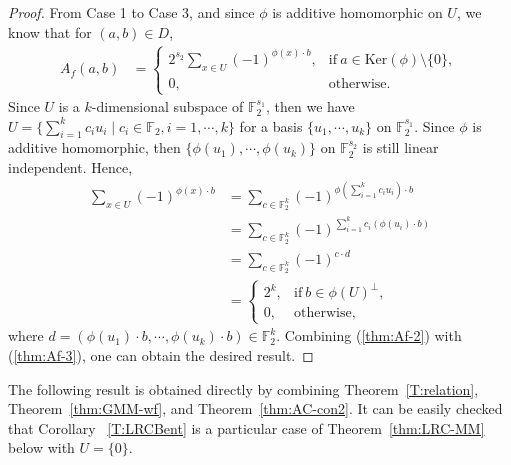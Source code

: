 \documentclass[10pt]{article}
\newcommand{\F}{\mathbb{F}}
\newcommand{\0}{\textbf{0}}
\newcommand{\1}{\textbf{1}}
\begin{document}
{\begin{proof}
    From Case 1 to Case 3, and since $\phi$ is additive homomorphic on $U$, we know that for  $(a,b)\in D$,
    \begin{align}\label{thm:Af-2}
        A_f(a,b)&=\left\{\begin{array}{ll}
                         2^{s_2} \sum_{x\in U} (-1)^{\phi(x)\cdot b}, & \mbox{if}~a\in \mathrm{Ker}(\phi)\setminus\{0\},\\
                         0, & \mbox{otherwise}.
                         \end{array}\right.
    \end{align}
    Since $U$ is a  $k$-dimensional subspace of $\F_2^{s_1}$, then we have $U=\{\sum_{i=1}^k c_i u_i\mid c_i\in \F_2, i=1,\cdots, k\}$ for a basis $\{u_1,\cdots, u_k\}$ on $\F_2^{s_1}$. Since $\phi$ is additive homomorphic, then $\{\phi(u_1),\cdots, \phi(u_k)\}$ on $\F_2^{s_2}$ is still linear independent.
    Hence,
    \begin{align}
    \nonumber    \sum_{x\in U} (-1)^{\phi(x)\cdot b}&=\sum_{c\in \F_2^k} (-1)^{\phi\left(\sum_{i=1}^k c_i u_i\right)\cdot b}\\
    \nonumber                                       &=\sum_{c\in \F_2^k} (-1)^{\sum_{i=1}^k c_i \left(\phi(u_i)\cdot b\right)}\\
    \nonumber                                       &=\sum_{c\in \F_2^k}(-1)^{c\cdot d}\\
    \label{thm:Af-3}                                       &=\left\{\begin{array}{ll}
                                                                     2^k, & \mbox{if}~b\in \phi(U)^\bot,\\
                                                                     0, & \mbox{otherwise},
                                                                    \end{array}\right.
    \end{align}
    where $d=(\phi(u_1)\cdot b,\cdots,\phi(u_k)\cdot b)\in \F_2^k$.
    Combining (\ref{thm:Af-2}) with (\ref{thm:Af-3}), one can obtain the desired result.
\end{proof}
}


The following result is obtained directly by combining Theorem~\ref{T:relation}, Theorem~\ref{thm:GMM-wf}, and Theorem~\ref{thm:AC-con2}.
It can be easily checked that Corollary ~\ref{T:LRCBent} is a particular case of
Theorem~\ref{thm:LRC-MM} below with $U=\{0\}$.
\end{document}
